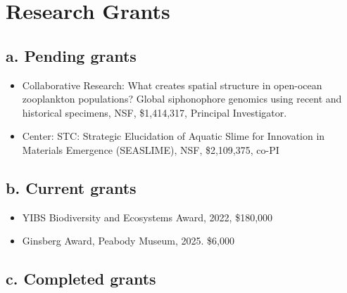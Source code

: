 \section{Research Grants}

\subsection*{a. Pending grants}

\begin{itemize}

\item Collaborative Research: What creates spatial structure in open-ocean zooplankton populations? Global siphonophore genomics using recent and historical specimens, NSF, \$1,414,317, Principal Investigator.

\item Center: STC: Strategic Elucidation of Aquatic Slime for Innovation in Materials Emergence (SEASLIME), NSF, \$2,109,375, co-PI


\end{itemize}



\subsection*{b. Current grants}

\begin{itemize}

\item YIBS Biodiversity and Ecosystems Award, 2022, \$180,000

\item Ginsberg Award, Peabody Museum, 2025. \$6,000

\end{itemize}

\subsection*{c. Completed grants}

